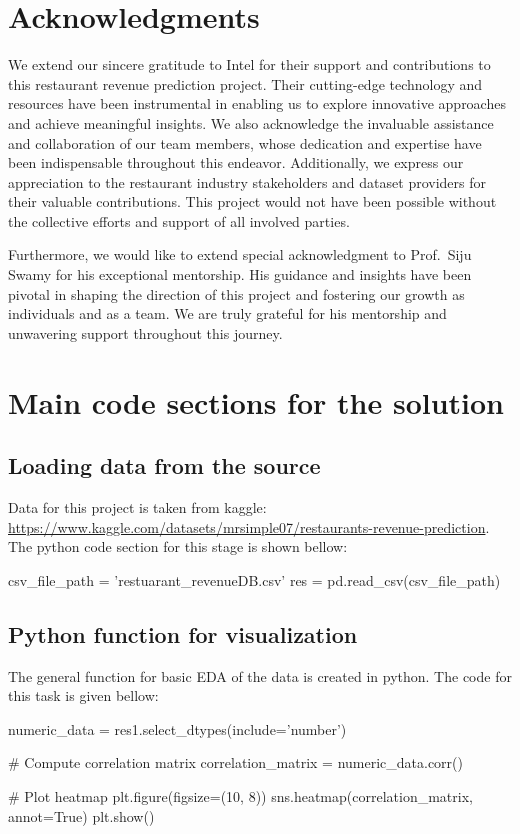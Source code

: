 \documentclass{josis}
\begin{document}
\section*{Acknowledgments}
We extend our sincere gratitude to Intel for their support and contributions to this restaurant revenue prediction project. Their cutting-edge technology and resources have been instrumental in enabling us to explore innovative approaches and achieve meaningful insights. We also acknowledge the invaluable assistance and collaboration of our team members, whose dedication and expertise have been indispensable throughout this endeavor. Additionally, we express our appreciation to the restaurant industry stakeholders and dataset providers for their valuable contributions. This project would not have been possible without the collective efforts and support of all involved parties. 

Furthermore, we would like to extend special acknowledgment to Prof.~Siju Swamy for his exceptional mentorship. His guidance and insights have been pivotal in shaping the direction of this project and fostering our growth as individuals and as a team. We are truly grateful for his mentorship and unwavering support throughout this journey.



\section{Main code sections for the solution}
\subsection{Loading data from the source}
Data for this project is taken from kaggle: \url{https://www.kaggle.com/datasets/mrsimple07/restaurants-revenue-prediction}. The python code section for this stage is shown bellow:
\begin{python}
csv_file_path = 'restuarant_revenueDB.csv'
res = pd.read_csv(csv_file_path)
\end{python}
\subsection{Python function for visualization}
The general function for basic EDA of the data is created in python. The code for this task is given bellow:
\begin{python}
numeric_data = res1.select_dtypes(include='number')

# Compute correlation matrix
correlation_matrix = numeric_data.corr()

# Plot heatmap
plt.figure(figsize=(10, 8))
sns.heatmap(correlation_matrix, annot=True)
plt.show()

\end{python}
\end{document}
